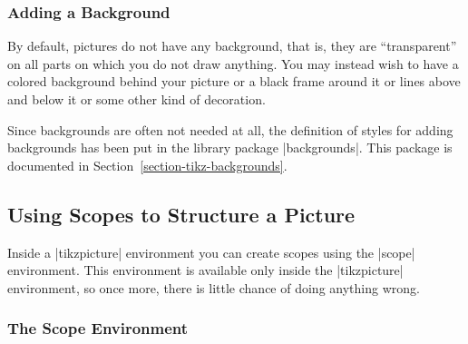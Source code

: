 \subsubsection{Adding a Background}

By default, pictures do not have any background, that is, they are
``transparent'' on all parts on which you do not draw anything. You may instead
wish to have a colored background behind your picture or a black frame around
it or lines above and below it or some other kind of decoration.

Since backgrounds are often not needed at all, the definition of styles for
adding backgrounds has been put in the library package |backgrounds|. This
package is documented in Section~\ref{section-tikz-backgrounds}.


\subsection{Using Scopes to Structure a Picture}

Inside a |{tikzpicture}| environment you can create scopes using the |{scope}|
environment. This environment is available only inside the |{tikzpicture}|
environment, so once more, there is little chance of doing anything wrong.


\subsubsection{The Scope Environment}

